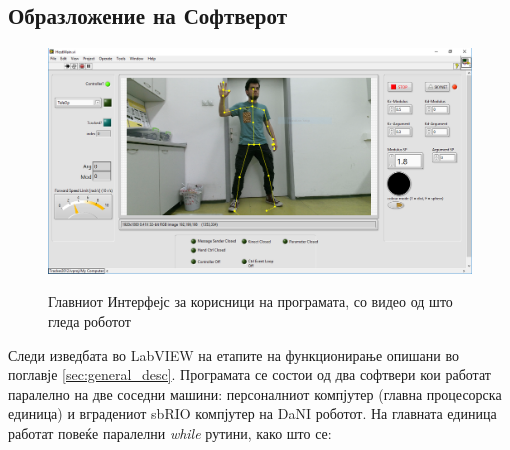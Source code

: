 \documentclass[12pt]{article}
\begin{document}
  \subsection{Образложение на Софтверот}

    \begin{figure}[H]
      \centering
      \includegraphics[width = 0.75\linewidth]{./images/pineapple_summer.png}
      \label{fig:pineapple}
      \caption{Главниот Интерфејс за корисници на програмата, со видео од што гледа роботот}
    \end{figure}
    Следи изведбата во LabVIEW на етапите на функционирање опишани во поглавје \ref{sec:general_desc}. Програмата се состои од два софтвери кои работат паралелно на две соседни машини: персоналниот компјутер (главна процесорска единица) и вградениот sbRIO компјутер на DaNI роботот. На главната единица работат повеќе паралелни \textit{while} рутини, како што се:
\end{document}
